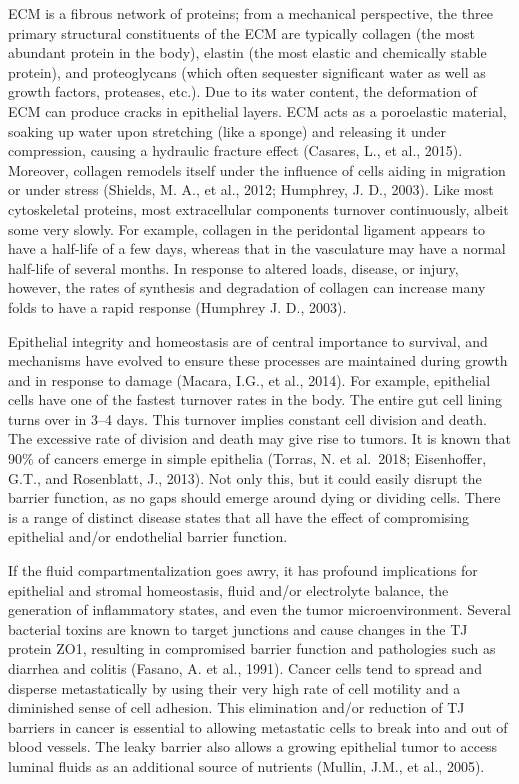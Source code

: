 ECM is a fibrous network of proteins; from a mechanical perspective, the
three primary structural constituents of the ECM are typically collagen
(the most abundant protein in the body), elastin (the most elastic and
chemically stable protein), and proteoglycans (which often sequester
significant water as well as growth factors, proteases, etc.). Due to
its water content, the deformation of ECM can produce cracks in
epithelial layers. ECM acts as a poroelastic material, soaking up water
upon stretching (like a sponge) and releasing it under compression,
causing a hydraulic fracture effect (Casares, L., et al., 2015).
Moreover, collagen remodels itself under the influence of cells aiding
in migration or under stress (Shields, M. A., et al., 2012; Humphrey, J.
D., 2003). Like most cytoskeletal proteins, most extracellular
components turnover continuously, albeit some very slowly. For example,
collagen in the peridontal ligament appears to have a half-life of a few
days, whereas that in the vasculature may have a normal half-life of
several months. In response to altered loads, disease, or injury,
however, the rates of synthesis and degradation of collagen can increase
many folds to have a rapid response (Humphrey J. D., 2003).

Epithelial integrity and homeostasis are of central importance to
survival, and mechanisms have evolved to ensure these processes are
maintained during growth and in response to damage (Macara, I.G., et
al., 2014). For example, epithelial cells have one of the fastest
turnover rates in the body. The entire gut cell lining turns over in
3--4 days. This turnover implies constant cell division and death. The
excessive rate of division and death may give rise to tumors. It is
known that 90\% of cancers emerge in simple epithelia (Torras, N. et
al.~2018; Eisenhoffer, G.T., and Rosenblatt, J., 2013). Not only this,
but it could easily disrupt the barrier function, as no gaps should
emerge around dying or dividing cells. There is a range of distinct
disease states that all have the effect of compromising epithelial
and/or endothelial barrier function.

If the fluid compartmentalization goes awry, it has profound
implications for epithelial and stromal homeostasis, fluid and/or
electrolyte balance, the generation of inflammatory states, and even the
tumor microenvironment. Several bacterial toxins are known to target
junctions and cause changes in the TJ protein ZO1, resulting in
compromised barrier function and pathologies such as diarrhea and
colitis (Fasano, A. et al., 1991). Cancer cells tend to spread and
disperse metastatically by using their very high rate of cell motility
and a diminished sense of cell adhesion. This elimination and/or
reduction of TJ barriers in cancer is essential to allowing metastatic
cells to break into and out of blood vessels. The leaky barrier also
allows a growing epithelial tumor to access luminal fluids as an
additional source of nutrients (Mullin, J.M., et al., 2005).

